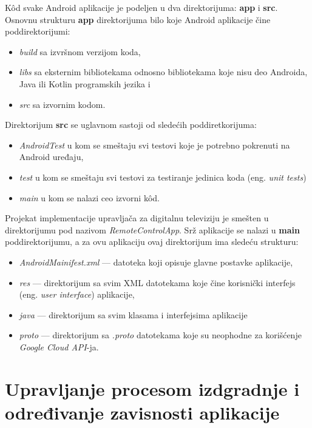 \documentclass[implementacija.tex]{subfiles}
\begin{document}
K\^{o}d svake Android aplikacije je podeljen u dva direktorijuma: \textbf{app} i \textbf{src}. Osnovnu strukturu \textbf{app} direktorijuma bilo koje Android aplikacije čine poddirektorijumi: 

\begin{itemize}
\item \textit{build} sa izvršnom verzijom koda,
\item \textit{libs} sa eksternim bibliotekama odnosno bibliotekama koje nisu deo Androida, Java ili Kotlin programskih jezika i
\item \textit{src} sa izvornim kodom.
\end{itemize}

 Direktorijum \textbf{src} se uglavnom sastoji od sledećih poddiretkorijuma: 
\begin{itemize}
\item \textit{AndroidTest} u kom se smeštaju svi testovi koje je potrebno pokrenuti na Android uređaju, 
\item \textit{test} u kom se smeštaju svi testovi za testiranje jedinica koda (eng. \textit{unit tests})
\item \textit{main} u kom se nalazi ceo izvorni k\^{o}d.
\end{itemize}

Projekat implementacije upravljača za digitalnu televiziju je smešten u direktorijumu pod nazivom \textit{RemoteControlApp}. Srž aplikacije se nalazi u \textbf{main} poddirektorijumu, a za ovu aplikaciju ovaj direktorijum ima sledeću strukturu:
\begin{itemize}
\item \textit{AndroidMainifest.xml} --- datoteka koji opisuje glavne postavke aplikacije,
\item \textit{res} --- direktorijum sa svim XML datotekama koje čine korisnički interfejs (eng. \textit{user interface}) aplikacije,
\item \textit{java} --- direktorijum sa svim klasama i interfejsima aplikacije
\item \textit{proto} --- direktorijum sa \textit{.proto} datotekama koje su neophodne za korišćenje \textit{Google Cloud API}-ja.
\end{itemize}

\section{Upravljanje procesom izdgradnje i određivanje zavisnosti aplikacije}
\end{document}
